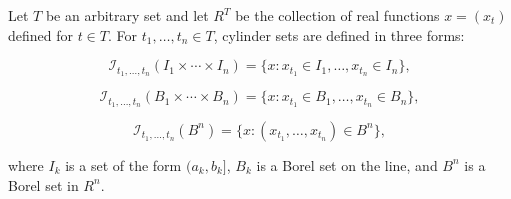 Let $T$ be an arbitrary set and let $R^T$ be the collection of real functions $x = (x_t)$ defined for $t \in T$. For $t_1, \ldots, t_n \in T$, cylinder sets are defined in three forms:

$$\mathcal{I}_{t_1, \ldots, t_n}(I_1 \times \cdots \times I_n) = \{x: x_{t_1} \in I_1, \ldots, x_{t_n} \in I_n\},$$

$$\mathcal{I}_{t_1, \ldots, t_n}(B_1 \times \cdots \times B_n) = \{x: x_{t_1} \in B_1, \ldots, x_{t_n} \in B_n\},$$

$$\mathcal{I}_{t_1, \ldots, t_n}(B^n) = \{x: (x_{t_1}, \ldots, x_{t_n}) \in B^n\},$$

where $I_k$ is a set of the form $(a_k, b_k]$, $B_k$ is a Borel set on the line, and $B^n$ is a Borel set in $R^n$.
